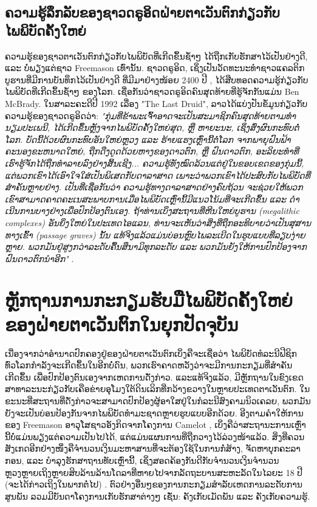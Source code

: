 \documentclass[10pt,twocolumn,letterpaper]{article}
\begin{document}
\subsection{ຄວາມຮູ້ລຶກລັບຂອງຊາວດຣູອິດຝ່າຍຕາເວັນຕົກກ່ຽວກັບໄພພິບັດຄັ້ງໃຫຍ່}

ຄວາມຮູ້ຂອງຊາວຕາເວັນຕົກກ່ຽວກັບໄພພິບັດທີ່ເກີດຂຶ້ນຊ້ຳໆ ໄດ້ຖືກເກັບຮັກສາໄວ້ເປັນຢ່າງດີ, ແລະ ບໍ່ພຽງແຕ່ຊາວ Freemason ເທົ່ານັ້ນ. ຊາວດຣູອິດ, ເຊິ່ງເປັນວັດທະນະທໍາຊາວແຄລຕິກບູຮານທີ່ມີການບັນທຶກໄວ້ເປັນຢ່າງດີ ທີ່ມີມາຢ່າງໜ້ອຍ 2400 ປີ  \cite{7}, ໄດ້ສືບທອດຄວາມຮູ້ກ່ຽວກັບໄພພິບັດທີ່ເກີດຂຶ້ນຊ້ຳໆ ຂອງໂລກ. ເຊື່ອກັນວ່າຊາວດຣູອິດຄົນສຸດທ້າຍທີ່ຮູ້ຈັກກັນແມ່ນ Ben McBrady. \cite{106}
ໃນສາລະຄະດີປີ 1992 ເລື່ອງ  "The Last Druid", ລາວໄດ້ແບ່ງປັນຂໍ້ມູນກ່ຽວກັບຄວາມຮູ້ຂອງຊາວດຣູອິດວ່າ: \textit{"ກຸ່ມທີ່ຂ້າພະເຈົ້າອາດຈະເປັນສະມາຊິກຄົນສຸດທ້າຍຕາມທໍານຽມປະເພນີ, ໄດ້ເກີດຂຶ້ນຫຼັງຈາກໄພພິບັດຄັ້ງໃຫຍ່ສຸດ, ຫຼື ຫາຍະນະ, ເຊິ່ງສົ່ງຜົນກະທົບຕໍ່ໂລກ. ບັດນີ້ດ້ວຍຜົນກະທົບອັນໃຫຍ່ຫຼວງ ແລະ ຮ້າຍແຮງເຫຼົ່ານີ້ຕໍ່ໂລກ ຈາກພາຍຸຝົນຟ້າຄະນອງຂະຫນາດໃຫຍ່, ຖືກດືງດູດດ້ວຍຫາງຂອງດາວຕົກ, ຫຼື ຝົນດາວຕົກ, ອະລິຍະທໍາທີ່ເຮົາຮູ້ຈັກໄດ້ຖືກທໍາລາຍລົງຢ່າງສິ້ນເຊີງ... ຄວາມຮູ້ທັງໝົດລ້ວນແຕ່ຢູ່ໃນຂອບເຂດຂອງກຸ່ມນີ້, ແຕ່ພວກເຂົາໄດ້ເອົາໃຈໃສ່ເປັນພິເສດກັບດາລາສາດ ເພາະວ່າພວກເຂົາໄດ້ປະສົບກັບໄພພິບັດທີ່ສໍາຄັນຫຼາຍຢ່າງ. ເປັນທີ່ເຊື່ອກັນວ່າ ຄວາມຮູ້ທາງດາລາສາດຢ່າງຄົບຖ້ວນ ຈະຊ່ວຍໃຫ້ພວກເຂົາສາມາດຄາດຄະເນສະພາບການເມື່ອໄພພິບັດເຫຼົ່ານີ້ມີແນວໂນ້ມທີ່ຈະເກີດຂຶ້ນ ແລະ ດໍາເນີນການບາງຢ່າງເພື່ອປົກປ້ອງຕົນເອງ. ຖ້າທ່ານເບິ່ງສະຖານທີ່ຫີນໃຫຍ່ບູຮານ (megalithic complexes) ອັນຍິ່ງໃຫຍ່ໃນປະເທດໄອແລນ, ທ່ານຈະເຫັນວ່າສິ່ງທີ່ຖືກອະທິບາຍວ່າເປັນສຸສານທາງເຂົ້າ (passage graves) ນັ້ນ ແທ້ຈິງແລ້ວແມ່ນບ່ອນຫຼົບໄພລະເບີດໃນຮູບແບບທີ່ລຽບງ່າຍຫຼາຍ. ພວກມັນຢູ່ສູງກວ່າລະດັບຄື້ນສຶນາມິທຸກລະດັບ ແລະ ພວກມັນຍັງໃຫ້ການປົກປ້ອງຈາກຝົນດາວຕົກນຳອີກ"} \cite{8,9}. \cite{107}

\section{ຫຼັກຖານການກະກຽມຮັບມືໄພພິບັດຄັ້ງໃຫຍ່ຂອງຝ່າຍຕາເວັນຕົກໃນຍຸກປັດຈຸບັນ}

ເນື່ອງຈາກວ່າອຳນາດປົກຄອງຢູ່ຂອງຝ່າຍຕາເວັນຕົກເບິ່ງຄືຈະເຊື່ອວ່າ ໄພພິບັດທໍລະນີຟີຊິກທົ່ວໂລກກຳລັງຈະເກີດຂຶ້ນໃນອີກບໍ່ດົນ, ພວກເຮົາຄາດຫວັງວ່າຈະມີການກະກຽມທີ່ສຳຄັນເກີດຂຶ້ນ ເພື່ອປົກປ້ອງຕົນເອງຈາກເຫດການດັ່ງກ່າວ. ແລະແທ້ຈິງແລ້ວ, ມີຫຼັກຖານໃນຂົງເຂດສາທາລະນະກ່ຽວກັບເຄືອຂ່າຍອຸໂມງໃຕ້ດິນເລິກທີ່ກວ້າງຂວາງໃນຫຼາຍປະເທດຕາເວັນຕົກ. ໃນຂະນະທີ່ສະຖານທີ່ດັ່ງກ່າວຈະສາມາດປົກປ້ອງຜູ້ອາໃສຢູ່ໃນກໍລະນີສົງຄາມນິວເຄລຍ, ພວກມັນຍັງຈະເປັນບ່ອນປ້ອງກັນຈາກໄພພິບັດທໍາມະຊາດຫຼາຍຮູບແບບອີກດ້ວຍ.
ອີງຕາມຄຳໃຫ້ການຂອງ Freemason ອາວຸໂສຊາວອັງກິດຈາກໂຄງການ Camelot \cite{4,6}, ເບິ່ງຄືວ່າສະຖານະການເຫຼົ່ານີ້ບໍ່ແມ່ນພຽງແຕ່ຄວາມເປັນໄປໄດ້, ແຕ່ແມ່ນແຜນການທີ່ຖືກວາງໄວ້ລ່ວງໜ້າແລ້ວ. ສິ່ງທີ່ຄວນສັງເກດອີກຢ່າງໜຶ່ງຄືຈໍານວນເງິນມະຫາສານທີ່ຈະຕ້ອງໃຊ້ໃນການກໍ່ສ້າງ, ຈັດຫາບຸກຄະລາກອນ, ແລະ ບໍາລຸງຮັກສາຖານທັບເຫຼົ່ານີ້, ເຊິ່ງສອດຄ້ອງກັນດີກັບຈໍານວນເງິນຈໍານວນຫຼວງຫຼາຍເຖິງຫຼາຍສິບລ້ານລ້ານໂດລາທີ່ຫາຍໄປຈາກລັດຖະບານສະຫະລັດໃນໄລຍະ 18 ປີ (ຈະໄດ້ກ່າວເຖິງໃນພາກຕໍ່ໄປ) \cite{11,12,13}. \cite{109}
ຕົວຢ່າງອື່ນໆຂອງການກະກຽມສຳລັບເຫດການລະດັບການສູນພັນ ລວມມີບັນດາໂຄງການເກັບຮັກສາຕ່າງໆ ເຊັ່ນ: ຄັງເກັບເມັດພັນ ແລະ ຄັງເກັບຄວາມຮູ້. \cite{110}
\end{document}

